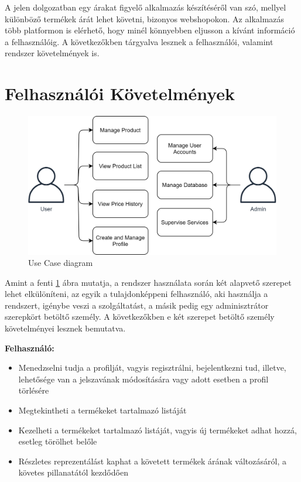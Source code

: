 A jelen dolgozatban egy árakat figyelő alkalmazás készítéséről van szó, mellyel különböző termékek árát lehet követni, bizonyos webshopokon. Az alkalmazás több platformon is elérhető, hogy minél könnyebben eljusson a kívánt információ a felhasználóig. A következőkben tárgyalva lesznek a felhasználói, valamint rendszer követelmények is.

\section{Felhasználói Követelmények}

\begin{figure}[H]
    \centering
    \includegraphics[scale=1.2]{figures/images/general_use_case.png}
    \caption{Use Case diagram}
    \label{fig:general_use_case}
\end{figure}

Amint a fenti \ref{fig:general_use_case} ábra mutatja, a rendszer használata során két alapvető szerepet lehet elkülöníteni, az egyik a tulajdonképpeni felhasználó, aki használja a rendszert, igénybe veszi a szolgáltatást, a másik pedig egy adminisztrátor szerepkört betöltő személy. A következőkben e két szerepet betöltő személy követelményei lesznek bemutatva.

\textbf{Felhasználó:}
\begin{itemize}
    \item Menedzselni tudja a profilját, vagyis regisztrálni, bejelentkezni tud, illetve, lehetősége van a jelszavának módosítására vagy adott esetben a profil törlésére
    \item Megtekintheti a termékeket tartalmazó listáját
    \item Kezelheti a termékeket tartalmazó listáját, vagyis új termékeket adhat hozzá, esetleg törölhet belőle
    \item Részletes reprezentálást kaphat a követett termékek árának változásáról, a követes pillanatától kezdődően
\end{itemize}

